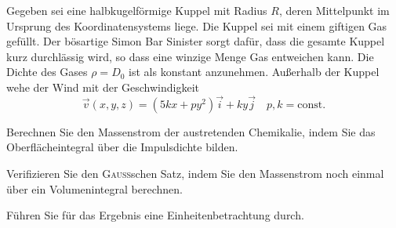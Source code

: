 %
\begin{atiTask}[
  title = Kuppelkatastrophe,
]

Gegeben sei eine halbkugelförmige Kuppel mit Radius $R$, deren Mittelpunkt im Ursprung des Koordinatensystems liege. Die Kuppel sei mit einem giftigen Gas gefüllt. Der bösartige Simon Bar Sinister sorgt dafür, dass die gesamte Kuppel kurz durchlässig wird, so dass eine winzige Menge Gas entweichen kann. Die Dichte des Gases $\rho=D_0$ ist als konstant anzunehmen. Außerhalb der Kuppel wehe der Wind mit der Geschwindigkeit 
\[
\vec{v}(x,y,z)=(5kx+py^2)\vec{i} +ky \vec{j}\quad p,k=\text{const}.
\]  

\begin{atiSubtasks}
\item Berechnen Sie den Massenstrom der austretenden Chemikalie, indem Sie das Oberflächeintegral über die Impulsdichte bilden.
\item Verifizieren Sie den \textsc{Gauss}schen Satz, indem Sie den Massenstrom noch einmal über ein Volumenintegral berechnen.
\item Führen Sie für das Ergebnis eine Einheitenbetrachtung durch. 
\end{atiSubtasks}
  
\end{atiTask}

\begin{atiSolution}

\end{atiSolution}

%